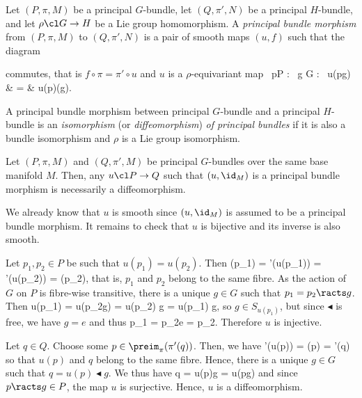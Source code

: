 \bd
Let $(P,\pi,M)$ be a principal $G$-bundle, let $(Q,\pi',N)$ be a principal $H$-bundle, and let $\rho\cl G \to H$ be a Lie group homomorphism. A \emph{principal bundle morphism} from $(P,\pi,M)$ to $(Q,\pi',N)$ is a pair of smooth maps $(u,f)$ such that the diagram
\bse
{}
\ese
commutes, that is $f \circ \pi=\pi'\circ u $ and $u$ is a $\rho$-equivariant map
\forall \, p\in P : \forall \, g \in G : \ u(p\racts g) & = & u(p)\blacktriangleleft \rho(g).
\ei
\ed

\bd
A principal bundle morphism between principal $G$-bundle and a principal $H$-bundle is an \emph{isomorphism} (or \emph{diffeomorphism}) \emph{of principal bundles} if it is also a bundle isomorphism and $\rho$ is a Lie group isomorphism.
\ed

\bl
Let $(P,\pi,M)$ and $(Q,\pi',M)$ be principal $G$-bundles over the same base manifold $M$. Then, any $u\cl P \to Q$ such that $(u,\id_M)$ is a principal bundle morphism is necessarily a diffeomorphism.
\bse
{}
\ese
\el

\bq
We already know that $u$ is smooth since $(u,\id_M)$ is assumed to be a principal bundle morphism. It remains to check that $u$ is bijective and its inverse is also smooth.
\ben[label=\roman*)]
\item Let $p_1,p_2\in P$ be such that $u(p_1)=u(p_2)$. Then
\bse
\pi(p_1) = \pi'(u(p_1)) = \pi'(u(p_2)) = \pi(p_2),
\ese
that is, $p_1$ and $p_2$ belong to the same fibre. As the action of $G$ on $P$ is fibre-wise transitive, there is a unique $g\in G$ such that $p_1 = p_2\racts g$. Then
\bse
u(p_1)  = u(p_2\racts g)  = u(p_2) \blacktriangleleft g = u(p_1) \blacktriangleleft g,
\ese
so $g\in S_{u(p_1)}$, but since $\blacktriangleleft$ is free, we have $g=e$ and thus
\bse
p_1 = p_2\racts e = p_2.
\ese
Therefore $u$ is injective.
\item Let $q\in Q$. Choose some $p\in \preim_\pi(\pi'(q))$. Then, we have
\bse
\pi'(u(p)) = \pi(p) = \pi'(q)
\ese
so that $u(p)$ and $q$ belong to the same fibre. Hence, there is a unique $g\in G$ such that $q = u(p)\blacktriangleleft g$. We thus have
\bse
q = u(p)\blacktriangleleft g = u(p\racts g)
\ese
and since $p\racts g\in P$, the map $u$ is surjective. 
\een
Hence, $u$ is a diffeomorphism.
\eq


